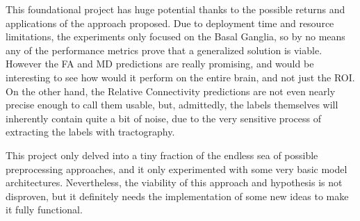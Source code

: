 \label{sec:conclusions}

This foundational project has huge potential thanks to the possible returns and applications of the approach proposed. Due to deployment time and resource limitations, the experiments only focused on the Basal Ganglia, so by no means any of the performance metrics prove that a generalized solution is viable. However the \ac{FA} and \ac{MD} predictions are really promising, and would be interesting to see how would it perform on the entire brain, and not just the \ac{ROI}. On the other hand, the Relative Connectivity predictions are not even nearly precise enough to call them usable, but, admittedly, the labels themselves will inherently contain quite a bit of noise, due to the very sensitive process of extracting the labels with tractography.\par
This project only delved into a tiny fraction of the endless sea of possible preprocessing approaches, and it only experimented with some very basic model architectures. Nevertheless, the viability of this approach and hypothesis is not disproven, but it definitely needs the implementation of some new ideas to make it fully functional.\par

